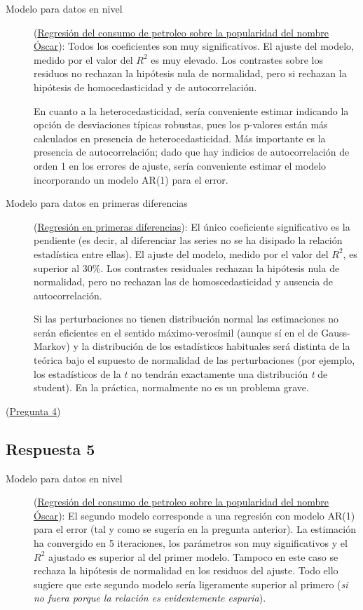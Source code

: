 \documentclass[10pt]{article}
\begin{document}
\begin{description}
\item[{Modelo para datos en nivel}] (\hyperref[sec:orgd830702]{Regresión del consumo de petroleo sobre la popularidad del nombre Óscar}): Todos los coeficientes son
muy significativos. El ajuste del modelo, medido por el valor del
\(R^2\) es muy elevado. Los contrastes sobre los residuos no
rechazan la hipótesis nula de normalidad, pero si rechazan la
hipótesis de homocedasticidad y de autocorrelación.

En cuanto a la heterocedasticidad, sería conveniente estimar
indicando la opción de desviaciones típicas robustas, pues los
p-valores están más calculados en presencia de
heterocedasticidad. Más importante es la presencia de
autocorrelación; dado que hay indicios de autocorrelación de orden 1
en los errores de ajuste, sería conveniente estimar el modelo
incorporando un modelo AR(1) para el error.

\item[{Modelo para datos en primeras diferencias}] (\hyperref[sec:orgbc115b4]{Regresión en primeras diferencias}): El único coeficiente significativo es la pendiente (es
decir, al diferenciar las series no se ha disipado la relación
estadística entre ellas). El ajuste del modelo, medido por el valor
del \(R^2\), es superior al 30\%. Los contrastes residuales rechazan
la hipótesis nula de normalidad, pero no rechazan las de
homoscedasticidad y ausencia de autocorrelación.

Si las perturbaciones no tienen distribución normal las estimaciones
no serán eficientes en el sentido máximo-verosímil (aunque sí en el
de Gauss-Markov) y la distribución de los estadísticos habituales
será distinta de la teórica bajo el supuesto de normalidad de las
perturbaciones (por ejemplo, los estadísticos de la \(t\) no tendrán
exactamente una distribución \emph{t} de student). En la práctica,
normalmente no es un problema grave.
\end{description}

(\hyperref[sec:org255901b]{Pregunta 4})
\subsection*{Respuesta 5}
\label{sec:org0149f98}


\begin{description}
\item[{Modelo para datos en nivel}] (\hyperref[sec:orgd830702]{Regresión del consumo de petroleo sobre la popularidad del nombre Óscar}): El segundo modelo
corresponde a una regresión con modelo AR(1) para el error (tal y
como se sugería en la pregunta anterior). La estimación ha
convergido en 5 iteraciones, los parámetros son muy significativos y
el \(R^2\) ajustado es superior al del primer modelo. Tampoco en este
caso se rechaza la hipótesis de normalidad en los residuos del
ajuste. Todo ello sugiere que este segundo modelo sería ligeramente
superior al primero (\emph{si no fuera porque la relación es
evidentemente espuria}).
\end{description}
\end{document}

